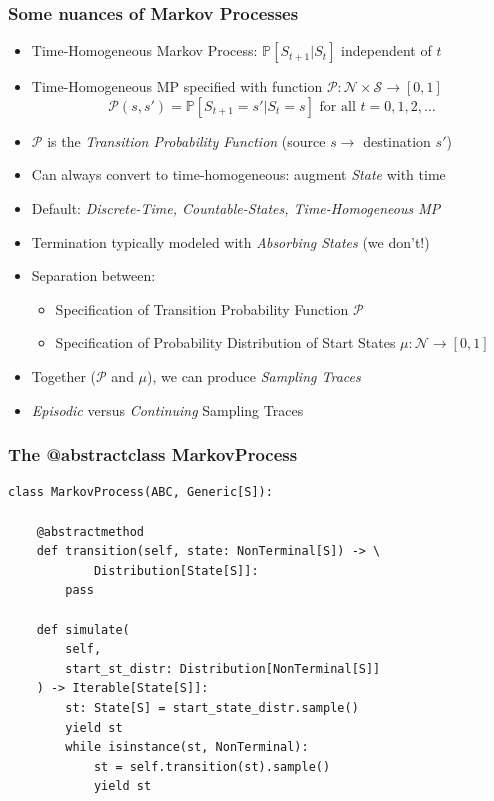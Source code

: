\documentclass[handout]{beamer}
\begin{document}
\begin{frame}
\frametitle{Some nuances of Markov Processes}
\pause
\begin{itemize}[<+->]
\item Time-Homogeneous Markov Process: $\mathbb{P}[S_{t+1}|S_t]$ independent of $t$
\item Time-Homogeneous MP specified with function $\mathcal{P}: \mathcal{N} \times \mathcal{S} \rightarrow [0,1]$
$$\mathcal{P}(s, s') = \mathbb{P}[S_{t+1}=s'|S_t=s] \text{ for all } t = 0, 1, 2, \ldots$$
\item $\mathcal{P}$ is the {\em Transition Probability Function} (source $s \rightarrow$ destination $s'$)
\item Can always convert to time-homogeneous: augment {\em State} with time
\item Default: {\em Discrete-Time, Countable-States, Time-Homogeneous MP}
\item Termination typically modeled with {\em Absorbing States} (we don't!)
\item Separation between:
\begin{itemize}
\item Specification of Transition Probability Function $\mathcal{P}$
\item Specification of Probability Distribution of Start States $\mu: \mathcal{N} \rightarrow [0, 1]$ 
\end{itemize}
\item Together ($\mathcal{P}$ and $\mu$), we can produce {\em Sampling Traces}
\item {\em Episodic} versus {\em Continuing} Sampling Traces
\end{itemize}
\end{frame}

\begin{frame}[fragile]
\frametitle{The @abstractclass MarkovProcess}
\pause
\begin{lstlisting}
class MarkovProcess(ABC, Generic[S]):

    @abstractmethod
    def transition(self, state: NonTerminal[S]) -> \
            Distribution[State[S]]:
        pass

    def simulate(
        self,
        start_st_distr: Distribution[NonTerminal[S]]
    ) -> Iterable[State[S]]:
        st: State[S] = start_state_distr.sample()
        yield st
        while isinstance(st, NonTerminal):
            st = self.transition(st).sample()
            yield st
\end{lstlisting}
\end{frame}
\end{document}
